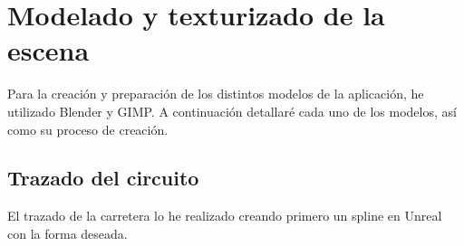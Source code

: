 









\section{Modelado y texturizado de la escena}

Para la creación y preparación de los distintos modelos de la aplicación, he utilizado Blender\cite{blender} y GIMP\cite{gimp}. A continuación detallaré cada uno de los modelos, así como su proceso de creación.

\subsection{Trazado del circuito}

El trazado de la carretera lo he realizado creando primero un spline en Unreal con la forma deseada. 

